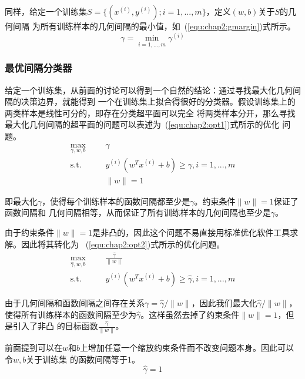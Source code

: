 同样，给定一个训练集$S=\{(x^{(i)},y^{(i)});i=1,...,m\}$，定义$(w,b)$关于$S$的几何间隔
为所有训练样本的几何间隔的最小值，如~(\ref{equ:chap2:gmargin})式所示。
\begin{equation}
  \label{equ:chap2:gmargin}
  \gamma=\min_{i=1,...,m}\gamma^{(i)}
\end{equation}

\subsubsection{最优间隔分类器}

给定一个训练集，从前面的讨论可以得到一个自然的结论：通过寻找最大化几何间隔的决策边界，就能得到
一个在训练集上拟合得很好的分类器。假设训练集上的两类样本是线性可分的，即存在分类超平面可以完全
将两类样本分开，那么寻找最大化几何间隔的超平面的问题可以表述为~(\ref{equ:chap2:opt1})式所示的优化
问题。
\begin{equation}
  \label{equ:chap2:opt1}
  \begin{aligned}
    \max_{\gamma,w,b} &
    & & \gamma \\
    \text{s.t.} &
    & & y^{(i)}\left(w^Tx^{(i)}+b\right)\geq \gamma, i=1,...,m \\
    \quad &
    & & \|w\|=1
  \end{aligned}
\end{equation}

即最大化$\gamma$，使得每个训练样本的函数间隔都至少是$\gamma$。约束条件$\|w\|=1$保证了函数间隔和
几何间隔相等，从而保证了所有训练样本的几何间隔也至少是$\gamma$。

由于约束条件$\|w\|=1$是非凸的，因此这个问题不易直接用标准优化软件工具求解。因此将其转化为
~(\ref{equ:chap2:opt2})式所示的优化问题。
\begin{equation}
  \label{equ:chap2:opt2}
  \begin{aligned}
    \max_{\hat{\gamma},w,b} &
    & & \frac{\hat{\gamma}}{\|w\|} \\
    \text{s.t.} &
    & & y^{(i)}\left(w^Tx^{(i)}+b\right)\geq \hat{\gamma}, i=1,...,m
  \end{aligned}
\end{equation}

由于几何间隔和函数间隔之间存在关系$\gamma=\hat{\gamma}/\|w\|$，因此我们最大化$\hat{\gamma}/\|w\|$，
使得所有训练样本的函数间隔至少为$\hat{\gamma}$。这样虽然去掉了约束条件$\|w\|=1$，但是引入了非凸
的目标函数$\frac{\hat{\gamma}}{\|w\|}$。

前面提到可以在$w$和$b$上增加任意一个缩放约束条件而不改变问题本身。因此可以令$w,b$关于训练集
的函数间隔等于1。
\begin{equation}
  \label{equ:chap2:constrain}
  \hat{\gamma} = 1
\end{equation}

